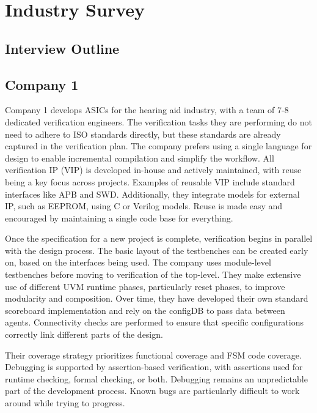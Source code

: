 \documentclass[12pt]{report}
\begin{document}
\chapter{Industry Survey} %

\section{Interview Outline} %

\section{Company 1} %

Company 1 develops ASICs for the hearing aid industry, with a team of 7-8 dedicated verification engineers. The
verification tasks they are performing do not need to adhere to ISO standards directly, but these standards are
already captured in the verification plan. The company prefers using a single language for design to enable
incremental compilation and simplify the workflow. All verification IP (VIP) is developed in-house and actively
maintained, with reuse being a key focus across projects. Examples of reusable VIP include standard interfaces like
APB and SWD. Additionally, they integrate models for external IP, such as EEPROM, using C or Verilog models. Reuse is
made easy and encouraged by maintaining a single code base for everything.

Once the specification for a new project is complete, verification begins in parallel with the design process. The
basic layout of the testbenches can be created early on, based on the interfaces being used. The company uses
module-level testbenches before moving to verification of the top-level. They make extensive use of different UVM
runtime phases, particularly reset phases, to improve modularity and composition. Over time, they have developed
their own standard scoreboard implementation and rely on the configDB to pass data between agents. Connectivity
checks are performed to ensure that specific configurations correctly link different parts of the design.

Their coverage strategy prioritizes functional coverage and FSM code coverage. Debugging is supported by
assertion-based verification, with assertions used for runtime checking, formal checking, or both. Debugging remains
an unpredictable part of the development process. Known bugs are particularly difficult to work around while trying to progress.
\end{document}
